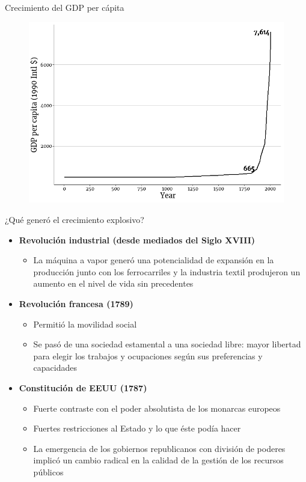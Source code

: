 \documentclass{beamer}
\begin{document}
\begin{frame}{Crecimiento del GDP per cápita}
    \begin{figure} [H]   \includegraphics[scale=0.5]{Slides Principios de Economia/Figures/C17.1.png}
\end{figure}
\end{frame}

\begin{frame}{¿Qué generó el crecimiento explosivo?}
    \begin{itemize}
    \item \textbf{Revolución industrial (desde mediados del Siglo XVIII)}
    \begin{itemize}
        \item La máquina a vapor generó una potencialidad de expansión en la producción junto con los ferrocarriles y la industria textil produjeron un aumento en el nivel de vida sin precedentes
    \end{itemize}
    
    \item \textbf{Revolución francesa (1789)}
    \begin{itemize}
        \item Permitió la movilidad social
        \item Se pasó de una sociedad estamental a una sociedad libre: mayor libertad para elegir los trabajos y ocupaciones según sus preferencias y capacidades
    \end{itemize}
     \item \textbf{Constitución de EEUU (1787)}
     \begin{itemize}
        \item Fuerte contraste con el poder absolutista de los monarcas europeos
        \item Fuertes restricciones al Estado y lo que éste podía hacer
        \item La emergencia de los gobiernos republicanos con división de poderes implicó un cambio radical en la calidad de la gestión de los recursos públicos
    \end{itemize}
\end{itemize}
\end{frame}
\end{document}
